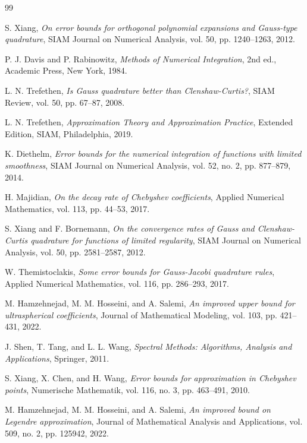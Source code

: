 \documentclass[12pt,a4paper]{article}
\begin{document}
\begin{thebibliography}{99}
    
    S. Xiang, 
    \emph{On error bounds for orthogonal polynomial expansions and Gauss-type quadrature},
    SIAM Journal on Numerical Analysis, 
    vol. 50, 
    pp. 1240--1263, 
    2012.
    
    P. J. Davis and P. Rabinowitz, 
    \emph{Methods of Numerical Integration}, 
    2nd ed., 
    Academic Press, 
    New York, 
    1984.
    
    L. N. Trefethen, 
    \emph{Is Gauss quadrature better than Clenshaw-Curtis?},
    SIAM Review, 
    vol. 50, 
    pp. 67--87, 
    2008.
    
    L. N. Trefethen, 
    \emph{Approximation Theory and Approximation Practice}, 
    Extended Edition, 
    SIAM, 
    Philadelphia, 
    2019.
    
    K. Diethelm, 
    \emph{Error bounds for the numerical integration of functions with limited smoothness},
    SIAM Journal on Numerical Analysis, 
    vol. 52, 
    no. 2, 
    pp. 877--879, 
    2014.
    
    H. Majidian, 
    \emph{On the decay rate of Chebyshev coefficients},
    Applied Numerical Mathematics, 
    vol. 113, 
    pp. 44--53, 
    2017.
    
    S. Xiang and F. Bornemann, 
    \emph{On the convergence rates of Gauss and Clenshaw-Curtis quadrature for functions of limited regularity},
    SIAM Journal on Numerical Analysis, 
    vol. 50, 
    pp. 2581--2587, 
    2012.
    
    W. Themistoclakis, 
    \emph{Some error bounds for Gauss-Jacobi quadrature rules},
    Applied Numerical Mathematics, 
    vol. 116, 
    pp. 286--293, 
    2017.
    
    M. Hamzehnejad, M. M. Hosseini, and A. Salemi, 
    \emph{An improved upper bound for ultraspherical coefficients},
    Journal of Mathematical Modeling, 
    vol. 103, 
    pp. 421--431, 
    2022.
    
    J. Shen, T. Tang, and L. L. Wang, 
    \emph{Spectral Methods: Algorithms, Analysis and Applications}, 
    Springer, 
    2011.
    
    S. Xiang, X. Chen, and H. Wang, 
    \emph{Error bounds for approximation in Chebyshev points},
    Numerische Mathematik, 
    vol. 116, 
    no. 3, 
    pp. 463--491, 
    2010.
    
    M. Hamzehnejad, M. M. Hosseini, and A. Salemi, 
    \emph{An improved bound on Legendre approximation},
    Journal of Mathematical Analysis and Applications, 
    vol. 509, 
    no. 2, 
    pp. 125942, 
    2022.
    
\end{thebibliography}
\end{document}
